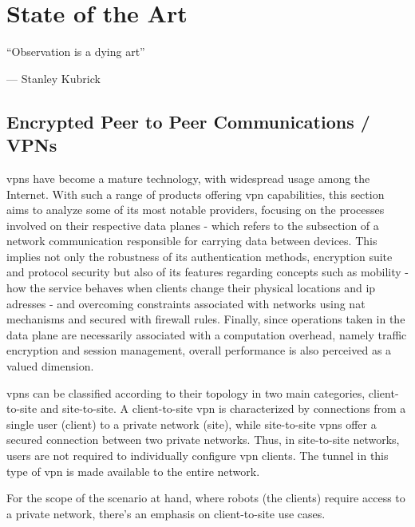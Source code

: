 \documentclass[11pt,twoside,a4paper]{report}
\begin{document}
\cleardoublepage


\chapter{State of the Art}
\label{chapter:sota}

\begin{minipage}{50mm}
     \centering %
     ``Observation is a dying art''
          \begin{flushright}
          --- Stanley Kubrick
          \end{flushright}
     \end{minipage}

\section{Encrypted Peer to Peer Communications / VPNs}

\ac{vpn}s have become a mature technology, with widespread usage among the Internet. With such a range of products offering \ac{vpn} capabilities, this section aims to analyze some of its most notable providers, focusing on the processes involved on their respective data planes - which refers to the subsection of a network communication responsible for carrying data between devices. This implies not only the robustness of its authentication methods, encryption suite and protocol security but also of its features regarding concepts such as mobility - how the service behaves when clients change their physical locations and \ac{ip} adresses - and overcoming constraints associated with networks using \ac{nat} mechanisms and secured with firewall rules. Finally, since operations taken in the data plane are necessarily associated with a computation overhead, namely traffic encryption and session management, overall performance is also perceived as a valued dimension.

\ac{vpn}s can be classified according to their topology in two main categories, client-to-site and site-to-site. A client-to-site \ac{vpn} is characterized by connections from a single user (client) to a private network (site), while site-to-site \ac{vpn}s offer a secured connection between two private networks. Thus, in site-to-site networks, users are not required to individually configure \ac{vpn} clients. The tunnel in this type of \ac{vpn} is made available to the entire network.

For the scope of the scenario at hand, where robots (the clients) require access to a private network, there's an emphasis on client-to-site use cases.
\end{document}
